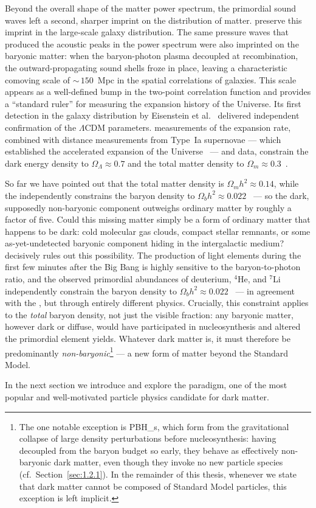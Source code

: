 Beyond the overall shape of the matter power spectrum, the primordial sound waves left a second, sharper imprint on the distribution of matter.
\BAO preserve this imprint in the large-scale galaxy distribution.
The same pressure waves that produced the acoustic peaks in the \CMB power spectrum were also imprinted on the baryonic matter: when the baryon-photon plasma decoupled at recombination, the outward-propagating sound shells froze in place, leaving a characteristic comoving scale of ${\sim}\,150$~Mpc in the spatial correlations of galaxies.
This scale appears as a well-defined bump in the two-point correlation function and provides a ``standard ruler'' for measuring the expansion history of the Universe.
Its first detection in the galaxy distribution by Eisenstein et al.~\cite{SDSS:2005xqv} delivered independent confirmation of the $\Lambda$CDM parameters.
\BAO measurements of the expansion rate, combined with distance measurements from Type~Ia supernovae --- which established the accelerated expansion of the Universe~\cite{SupernovaSearchTeam:1998fmf,SupernovaCosmologyProject:1998vns} --- and \CMB data, constrain the dark energy density to $\Omega_\Lambda \approx 0.7$ and the total matter density to $\Omega_m \approx 0.3$~\cite{Aghanim:2018eyx,Pan-STARRS1:2017jku}.

So far we have pointed out that the total matter density is $\Omega_m h^2 \approx 0.14$, while the \CMB independently constrains the baryon density to $\Omega_b h^2 \approx 0.022$~\cite{Aghanim:2018eyx} --- so the dark, supposedly non-baryonic component outweighs ordinary matter by roughly a factor of five.
Could this missing matter simply be a form of ordinary matter that happens to be dark: cold molecular gas clouds, compact stellar remnants, or some as-yet-undetected baryonic component hiding in the intergalactic medium?
\BBN decisively rules out this possibility.
The production of light elements during the first few minutes after the Big Bang is highly sensitive to the baryon-to-photon ratio, and the observed primordial abundances of deuterium, $^4$He, and $^7$Li independently constrain the baryon density to $\Omega_b h^2 \approx 0.022$~\cite{Iocco:2008va,ParticleDataGroup:2022pth} --- in agreement with the \CMB, but through entirely different physics.
Crucially, this constraint applies to the \emph{total} baryon density, not just the visible fraction: any baryonic matter, however dark or diffuse, would have participated in nucleosynthesis and altered the primordial element yields.
Whatever dark matter is, it must therefore be predominantly \emph{non-baryonic}\footnote{The one notable exception is \glspl{PBH_}, which form from the gravitational collapse of large density perturbations before nucleosynthesis: having decoupled from the baryon budget so early, they behave as effectively non-baryonic dark matter, even though they invoke no new particle species (cf.\ Section~\ref{sec:1.2.1}). In the remainder of this thesis, whenever we state that dark matter cannot be composed of Standard Model particles, this exception is left implicit.} --- a new form of matter beyond the Standard Model.

In the next section we introduce and explore the \WIMP paradigm, one of the most popular and well-motivated particle physics candidate for dark matter.

